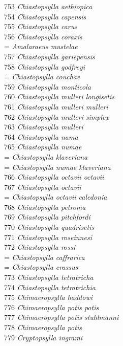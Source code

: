 \documentclass[
]{article}
\begin{document}
753 \emph{Chiastopsylla aethiopica}\\
754 \emph{Chiastopsylla capensis}\\
755 \emph{Chiastopsylla carus}\\
756 \emph{Chiastopsylla coraxis}\\
= \emph{Amalaraeus mustelae}\\
757 \emph{Chiastopsylla gariepensis}\\
758 \emph{Chiastopsylla godfreyi}\\
= \emph{Chiastopsylla couchae}\\
759 \emph{Chiastopsylla monticola}\\
760 \emph{Chiastopsylla mulleri longisetis}\\
761 \emph{Chiastopsylla mulleri mulleri}\\
762 \emph{Chiastopsylla mulleri simplex}\\
763 \emph{Chiastopsylla mulleri}\\
764 \emph{Chiastopsylla nama}\\
765 \emph{Chiastopsylla numae}\\
= \emph{Chiastopsylla klaveriana}\\
= \emph{Chiastopsylla numae klaveriana}\\
766 \emph{Chiastopsylla octavii octavii}\\
767 \emph{Chiastopsylla octavii}\\
= \emph{Chiastopsylla octavii caledonia}\\
768 \emph{Chiastopsylla petroma}\\
769 \emph{Chiastopsylla pitchfordi}\\
770 \emph{Chiastopsylla quadrisetis}\\
771 \emph{Chiastopsylla roseinnesi}\\
772 \emph{Chiastopsylla rossi}\\
= \emph{Chiastopsylla caffrarica}\\
= \emph{Chiastopsylla crassus}\\
773 \emph{Chiastopsylla tetratricha}\\
774 \emph{Chiastopsylla tetratrichia}\\
775 \emph{Chimaeropsylla haddowi}\\
776 \emph{Chimaeropsylla potis potis}\\
777 \emph{Chimaeropsylla potis stuhlmanni}\\
778 \emph{Chimaeropsylla potis}\\
779 \emph{Cryptopsylla ingrami}\\
\end{document}
